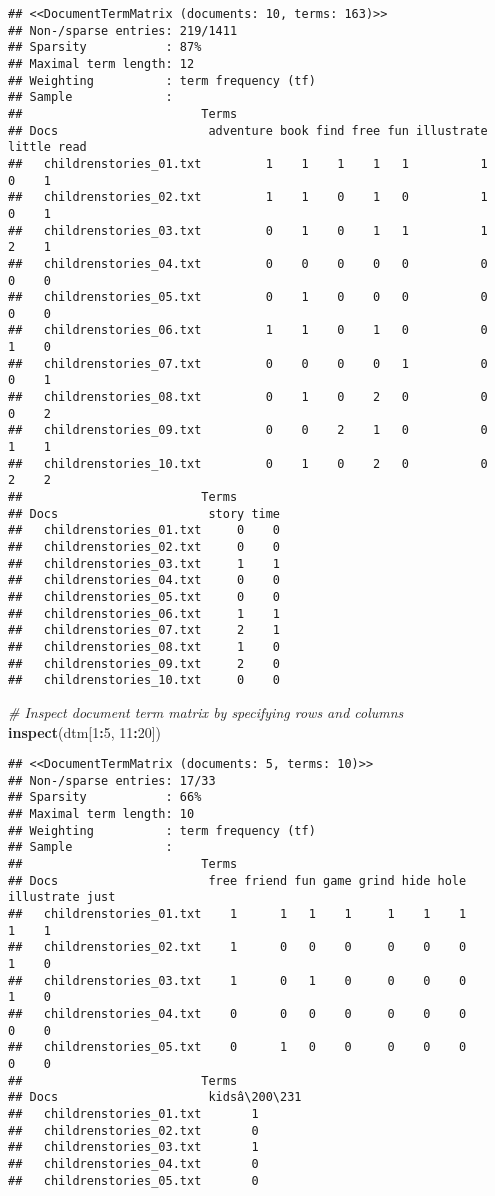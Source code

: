 \documentclass[
]{article}
\newenvironment{Shaded}{\begin{snugshade}}{\end{snugshade}}
\newcommand{\CommentTok}[1]{\textcolor[rgb]{0.56,0.35,0.01}{\textit{#1}}}
\newcommand{\DecValTok}[1]{\textcolor[rgb]{0.00,0.00,0.81}{#1}}
\newcommand{\KeywordTok}[1]{\textcolor[rgb]{0.13,0.29,0.53}{\textbf{#1}}}
\newcommand{\NormalTok}[1]{#1}
\newcommand{\OperatorTok}[1]{\textcolor[rgb]{0.81,0.36,0.00}{\textbf{#1}}}
\begin{document}
\begin{verbatim}
## <<DocumentTermMatrix (documents: 10, terms: 163)>>
## Non-/sparse entries: 219/1411
## Sparsity           : 87%
## Maximal term length: 12
## Weighting          : term frequency (tf)
## Sample             :
##                         Terms
## Docs                     adventure book find free fun illustrate little read
##   childrenstories_01.txt         1    1    1    1   1          1      0    1
##   childrenstories_02.txt         1    1    0    1   0          1      0    1
##   childrenstories_03.txt         0    1    0    1   1          1      2    1
##   childrenstories_04.txt         0    0    0    0   0          0      0    0
##   childrenstories_05.txt         0    1    0    0   0          0      0    0
##   childrenstories_06.txt         1    1    0    1   0          0      1    0
##   childrenstories_07.txt         0    0    0    0   1          0      0    1
##   childrenstories_08.txt         0    1    0    2   0          0      0    2
##   childrenstories_09.txt         0    0    2    1   0          0      1    1
##   childrenstories_10.txt         0    1    0    2   0          0      2    2
##                         Terms
## Docs                     story time
##   childrenstories_01.txt     0    0
##   childrenstories_02.txt     0    0
##   childrenstories_03.txt     1    1
##   childrenstories_04.txt     0    0
##   childrenstories_05.txt     0    0
##   childrenstories_06.txt     1    1
##   childrenstories_07.txt     2    1
##   childrenstories_08.txt     1    0
##   childrenstories_09.txt     2    0
##   childrenstories_10.txt     0    0
\end{verbatim}

\begin{Shaded}
\begin{Highlighting}[]
\CommentTok{# Inspect document term matrix by specifying rows and columns}
\KeywordTok{inspect}\NormalTok{(dtm[}\DecValTok{1}\OperatorTok{:}\DecValTok{5}\NormalTok{, }\DecValTok{11}\OperatorTok{:}\DecValTok{20}\NormalTok{])}
\end{Highlighting}
\end{Shaded}

\begin{verbatim}
## <<DocumentTermMatrix (documents: 5, terms: 10)>>
## Non-/sparse entries: 17/33
## Sparsity           : 66%
## Maximal term length: 10
## Weighting          : term frequency (tf)
## Sample             :
##                         Terms
## Docs                     free friend fun game grind hide hole illustrate just
##   childrenstories_01.txt    1      1   1    1     1    1    1          1    1
##   childrenstories_02.txt    1      0   0    0     0    0    0          1    0
##   childrenstories_03.txt    1      0   1    0     0    0    0          1    0
##   childrenstories_04.txt    0      0   0    0     0    0    0          0    0
##   childrenstories_05.txt    0      1   0    0     0    0    0          0    0
##                         Terms
## Docs                     kidsâ\200\231
##   childrenstories_01.txt       1
##   childrenstories_02.txt       0
##   childrenstories_03.txt       1
##   childrenstories_04.txt       0
##   childrenstories_05.txt       0
\end{verbatim}
\end{document}
